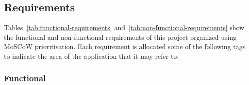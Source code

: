 


\subsection{Requirements}
\label{subsec:requirements}


Tables~\ref{tab:functional-requirements} and~\ref{tab:non-functional-requirements} show the functional and non-functional requirements of this project organized using MoSCoW prioritisation. Each requirement is allocated some of the following tags to indicate the area of the application that it may refer to:

\subsubsection*{Functional}

